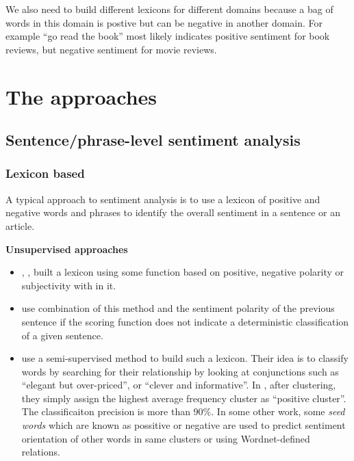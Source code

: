\documentclass{article}
\begin{document}
\begin{multicols}{2}
    We also need to build different lexicons for different domains
because a bag of words in this domain is postive but can be negative in another
domain. For example ``go read the book'' most likely indicates positive
sentiment for book reviews, but negative sentiment for movie reviews.

 

\section{The approaches}

  \subsection{Sentence/phrase-level sentiment analysis}

    \subsubsection{Lexicon based}
      
        A typical approach to sentiment analysis is to use a lexicon of positive
  and negative words and phrases to identify the overall sentiment in a sentence
  or an article. 

        \textbf{Unsupervised approaches}
          \begin{itemize}
              \item \citet{Wiebe2000}, \citet{Turney2002}, \citet{Pan2010} built
a  lexicon using some function based on positive, negative polarity or
subjectivity  with in it.
              \item \citet{Liu98} use combination of this method and
  the sentiment polarity of the previous sentence if the scoring function does
not
  indicate a deterministic classification of a given sentence.
              \item \citet{Hatzivassiloglou1997}
  use a semi-supervised method to build such a lexicon. Their idea is to
classify
  words by searching for their relationship by looking at conjunctions such as
  ``elegant but over-priced'', or ``clever and informative''. In
  \citet{Hatzivassiloglou1997}, after clustering, they simply assign the highest
  average frequency cluster as ``positive cluster''. The classificaiton
precision
  is more than 90\%. In some other work, some \textit{seed words} which are
known
  as possitive or negative are used to predict sentiment orientation of other
  words in same clusters or using Wordnet-defined relations.      		
          \end{itemize}
      

\end{multicols}
\end{document}
